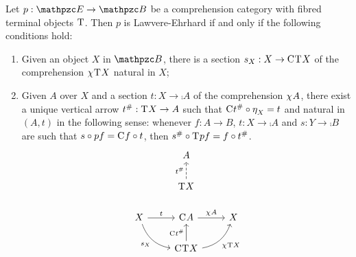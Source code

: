 \documentclass{lmcs} %
\theoremstyle{plain}\newtheorem{satz}[thm]{Satz} %
\begin{document}
			\begin{lem}\label{lem:ess-im}
				Let $p:\ct{E}\to\ct{B}$ be a comprehension category with fibred terminal objects $\mathrm{T}^{}$. Then $p$ is Lawvere-Ehrhard if and only if the following conditions hold:
				\begin{enumerate}
					\item Given an object $X$ in $\ct{B}$, there is a section $s_X:X\to\mathrm{C}^{}\mathrm{T}^{}X$ of the comprehension $\chi^{}\mathrm{T}^{}X$ natural in $X$;
					\item Given $A$ over $X$ and a section $t:X\to\comp{}A$ of the comprehension $\chi^{}A$, there exist a unique vertical arrow $t^{\#}:\mathrm{T}^{}X\to A$ such that $\mathrm{C}^{}t^{\#}\circ \mathrm{\eta}^{}_X= t$ and natural in $(A,t)$ in the following sense: whenever $f:A\to B$, $t:X\to\comp{}A$ and $s:Y\to\comp{}B$ are such that $s\circ pf=\mathrm{C}^{}f\circ t$, then $s^\#\circ\mathrm{T}^{}pf=f\circ t^\#$.
					\[\begin{tikzcd}
						& A \\
						& {\term{}X} \\
						X & {\comp{}A} & X \\
						& {\comp{}\term{}X}
						\arrow["{t^{\#}}", dashed, from=2-2, to=1-2]
						\arrow["t", from=3-1, to=3-2]
						\arrow["{s_X}"', bend right, from=3-1, to=4-2]
						\arrow["{\jcomp{}A}", from=3-2, to=3-3]
						\arrow["{\comp{}t^{\#}}", from=4-2, to=3-2]
						\arrow["{\jcomp{}\term{}X}"', bend right, from=4-2, to=3-3]
					\end{tikzcd}\]
				\end{enumerate}
			\end{lem}
			
\end{document}
